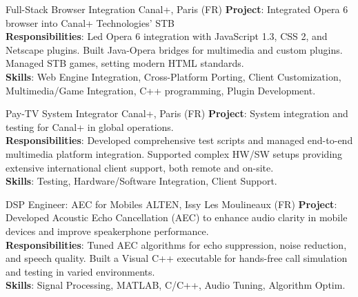 \documentclass[
  a4paper,
   maincolor=cvblue,
   sectioncolor=cvblue,
]{fortysecondscv}
\begin{document}
\begin{cvtable}
{Full-Stack Browser Integration}
{Canal+, Paris (FR)}
{
  \textbf{Project}: Integrated Opera 6 browser into Canal+ Technologies' STB\\
  \textbf{Responsibilities}:
      Led Opera 6 integration with JavaScript 1.3, CSS 2, and Netscape plugins. Built Java-Opera bridges for multimedia and custom plugins. Managed STB games, setting modern HTML standards.\\
  \textbf{Skills}: Web Engine Integration, Cross-Platform Porting, Client Customization, Multimedia/Game Integration, C++ programming, Plugin Development.\\
}




{Pay-TV System Integrator}
{Canal+,  Paris (FR)}
{
  \textbf{Project}: System integration and testing for Canal+ in global operations.\\
  \textbf{Responsibilities}:
      Developed comprehensive test scripts and managed end-to-end multimedia platform integration.
      Supported complex HW/SW setups providing extensive international client support, both remote and on-site.\\
  \textbf{Skills}: Testing, Hardware/Software Integration, Client Support.\\
}

    {DSP Engineer: AEC for Mobiles}
    {ALTEN, Issy Les Moulineaux (FR)}
    {
      \textbf{Project}: Developed Acoustic Echo Cancellation (AEC) to enhance audio clarity in mobile devices and improve speakerphone performance.\\
      \textbf{Responsibilities}:
          Tuned AEC algorithms for echo suppression, noise reduction, and speech quality. Built a Visual C++ executable for hands-free call simulation and testing in varied environments.\\
      \textbf{Skills}: Signal Processing, MATLAB, C/C++, Audio Tuning, Algorithm Optim.
    }

\end{cvtable}
\end{document}
